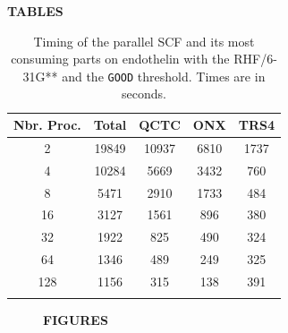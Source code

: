 \documentclass[prl,preprint,doublespace]{revtex4} %
\newcommand{\commentoutB}[1]{#1}
\begin{document}
\commentoutB{


\clearpage

\begin{center}
\bf  TABLES\\[1.cm]
\end{center}

\begin{table}[h]
  \centering
  \caption{\protect
    Timing of the parallel SCF and its most consuming parts
    on endothelin with the RHF/6-31G** and the {\tt GOOD} threshold.
    Times are in seconds.
  }\label{Tab:EndothelinTotalTiming}
  \begin{tabular}{ccccc}
    \toprule
    Nbr. Proc. & Total & QCTC & ONX & TRS4 \\
  \hline
    2 & 19849 & 10937 & 6810 & 1737 \\
    4 & 10284 &  5669 & 3432 &  760 \\
    8 &  5471 &  2910 & 1733 &  484 \\
   16 &  3127 &  1561 &  896 &  380 \\
   32 &  1922 &   825 &  490 &  324 \\
   64 &  1346 &   489 &  249 &  325 \\
  128 &  1156 &   315 &  138 &  391 \\
  \botrule
  \end{tabular}
\end{table}

\clearpage

\begin{figure}[h]
\begin{center}
\bf  FIGURES\\[1.cm]
\end{center}


\end{figure}}
\end{document}
